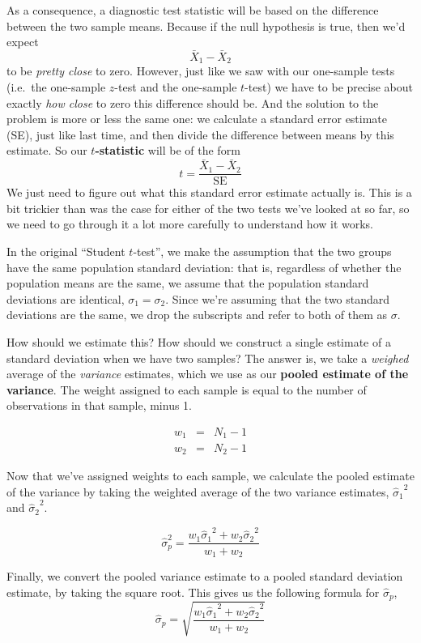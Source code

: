 \documentclass[
]{book}
\theoremstyle{definition}
\theoremstyle{definition}
\theoremstyle{definition}
\theoremstyle{definition}
\theoremstyle{remark}
\begin{document}
As a consequence, a diagnostic test statistic will be based on the difference between the two sample means. Because if the null hypothesis is true, then we'd expect
\[
\bar{X}_1 - \bar{X}_2
\]
to be \emph{pretty close} to zero. However, just like we saw with our one-sample tests (i.e.~the one-sample \(z\)-test and the one-sample \(t\)-test) we have to be precise about exactly \emph{how close} to zero this difference should be. And the solution to the problem is more or less the same one: we calculate a standard error estimate (SE), just like last time, and then divide the difference between means by this estimate. So our \textbf{\(t\)-statistic} will be of the form
\[
t = \frac{\bar{X}_1 - \bar{X}_2}{\mbox{SE}}
\]
We just need to figure out what this standard error estimate actually is. This is a bit trickier than was the case for either of the two tests we've looked at so far, so we need to go through it a lot more carefully to understand how it works.

In the original ``Student \(t\)-test'', we make the assumption that the two groups have the same population standard deviation: that is, regardless of whether the population means are the same, we assume that the population standard deviations are identical, \(\sigma_1 = \sigma_2\). Since we're assuming that the two standard deviations are the same, we drop the subscripts and refer to both of them as \(\sigma\).

How should we estimate this? How should we construct a single estimate of a standard deviation when we have two samples? The answer is, we take a \emph{weighed} average of the \emph{variance} estimates, which we use as our \textbf{pooled estimate of the variance}. The weight assigned to each sample is equal to the number of observations in that sample, minus 1.

\[
\begin{array}{rcl}
w_1 &=& N_1 - 1\\
w_2 &=& N_2 - 1
\end{array}
\]

Now that we've assigned weights to each sample, we calculate the pooled estimate of the variance by taking the weighted average of the two variance estimates, \({\hat\sigma_1}^2\) and \({\hat\sigma_2}^2\).

\[
\hat\sigma^2_p = \frac{w_1 {\hat\sigma_1}^2 + w_2 {\hat\sigma_2}^2}{w_1 + w_2}
\]

Finally, we convert the pooled variance estimate to a pooled standard deviation estimate, by taking the square root. This gives us the following formula for \(\hat\sigma_p\),
\[
\hat\sigma_p = \sqrt{\frac{w_1 {\hat\sigma_1}^2 + w_2 {\hat\sigma_2}^2}{w_1 + w_2}}
\]
\end{document}
